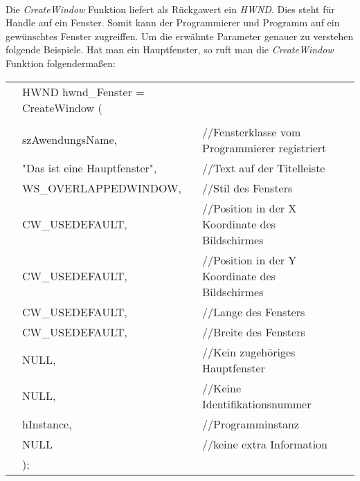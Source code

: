 \paragraph{}
Die \textit{CreateWindow} Funktion liefert als Rückgawert ein \textit{HWND}. Dies steht für Handle auf ein Fenster. Somit kann der Programmierer und Programm auf ein gewünschtes Fenster zugreiffen. Um die erwähnte Parameter genauer zu verstehen folgende Beispiele. Hat man ein Hauptfenster, so ruft man die \textit{CreateWindow} Funktion folgendermaßen:

\begin{tabular}{llll}
& HWND hwnd\_Fenster = CreateWindow (\\
\\
& szAwendungsName,					& //Fensterklasse vom Programmierer registriert\\                            
& "Das ist eine Hauptfenster",  	& //Text auf der Titelleiste\\                                
& WS\_OVERLAPPEDWINDOW,              & //Stil des Fensters\\                         
& CW\_USEDEFAULT,                    & //Position in der X Koordinate des Bildschirmes\\     
& CW\_USEDEFAULT,                    & //Position in der Y Koordinate des Bildschirmes\\     
& CW\_USEDEFAULT,                    & //Lange des Fensters\\                                  
& CW\_USEDEFAULT,                    & //Breite des Fensters\\                                 
& NULL,                              & //Kein zugehöriges Hauptfenster\\                           
& NULL,                              & //Keine Identifikationsnummer\\                               
& hInstance,                         & //Programminstanz\\                                 
& NULL                               & //keine extra Information\\  
& );                          
\end{tabular}                        

